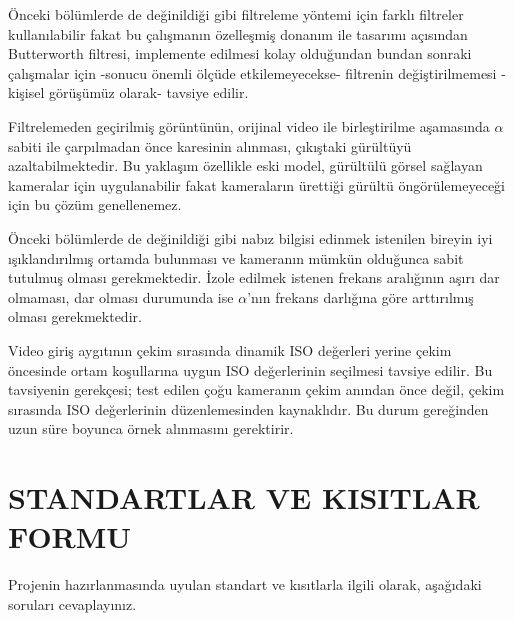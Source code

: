 \documentclass[a4paper, 12pt]{article}
\begin{document}
Önceki bölümlerde de değinildiği gibi filtreleme yöntemi için farklı filtreler kullanılabilir fakat bu çalışmanın özelleşmiş donanım ile tasarımı açısından Butterworth filtresi, implemente edilmesi kolay olduğundan bundan sonraki çalışmalar için -sonucu önemli ölçüde etkilemeyecekse- filtrenin değiştirilmemesi -kişisel görüşümüz olarak- tavsiye edilir. 

Filtrelemeden geçirilmiş görüntünün, orijinal video ile birleştirilme aşamasında $\alpha$ sabiti ile çarpılmadan önce karesinin alınması, çıkıştaki gürültüyü azaltabilmektedir. Bu yaklaşım özellikle eski model, gürültülü görsel sağlayan kameralar için uygulanabilir fakat kameraların ürettiği gürültü öngörülemeyeceği için bu çözüm genellenemez.

Önceki bölümlerde de değinildiği gibi nabız bilgisi edinmek istenilen bireyin iyi ışıklandırılmış ortamda bulunması ve kameranın mümkün olduğunca sabit tutulmuş olması gerekmektedir. İzole edilmek istenen frekans aralığının aşırı dar olmaması, dar olması durumunda ise $\alpha$'nın frekans darlığına göre arttırılmış olması gerekmektedir.

Video giriş aygıtının çekim sırasında dinamik ISO değerleri yerine çekim öncesinde ortam koşullarına uygun ISO değerlerinin seçilmesi tavsiye edilir. Bu tavsiyenin gerekçesi; test edilen çoğu kameranın çekim anından önce değil, çekim sırasında ISO değerlerinin düzenlemesinden kaynaklıdır. Bu durum gereğinden uzun süre boyunca örnek alınmasını gerektirir.

\newpage






\newpage 

\section*{STANDARTLAR VE KISITLAR FORMU}

Projenin hazırlanmasında uyulan standart ve kısıtlarla ilgili olarak, aşağıdaki soruları cevaplayınız.
\end{document}

